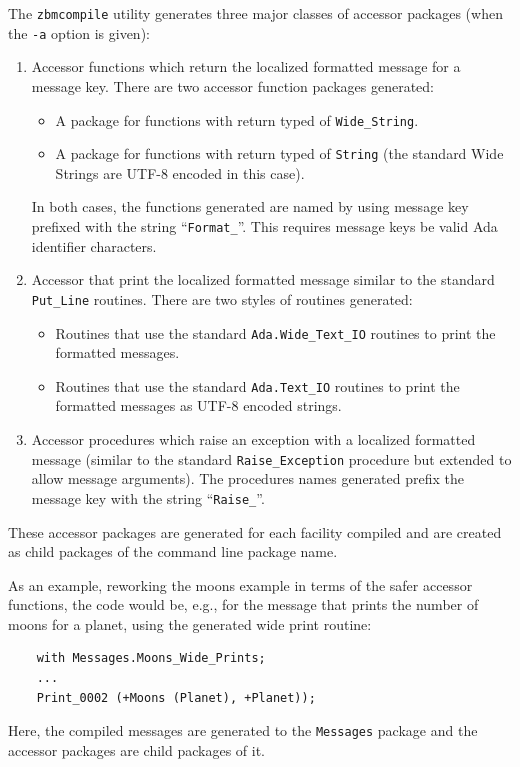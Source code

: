 The \texttt{zbmcompile} utility generates three major classes of accessor
packages (when the \texttt{-a} option is given):
\begin{enumerate}
\item	Accessor functions which return the localized formatted message for
	a message key.  There are two accessor function packages generated:
	\begin{itemize}
	\item	A package for functions with return typed of
	 	\texttt{Wide\_String}.
	\item	A package for functions with return typed of \texttt{String}
		(the standard Wide Strings are UTF-8 encoded in this case).
	\end{itemize}
	In both cases, the functions generated are named by using message key
	prefixed with the string ``\texttt{Format\_}''.  This requires message
	keys be valid Ada identifier characters.
\item   Accessor that print the localized formatted message similar to the
        standard \texttt{Put\_Line} routines.  There are two styles of routines
        generated:
        \begin{itemize}
        \item Routines that use the standard \texttt{Ada.Wide\_Text\_IO}
              routines to print the formatted messages.
        \item Routines that use the standard \texttt{Ada.Text\_IO}
              routines to print the formatted messages as UTF-8 encoded
              strings.
        \end{itemize}
\item	Accessor procedures which raise an exception with a localized formatted
	message (similar to the standard \texttt{Raise\_Exception} procedure
	but extended to allow message arguments).  The procedures names
	generated prefix the message key with the string ``\texttt{Raise\_}''.
\end{enumerate}

These accessor packages are generated for each facility compiled and are
created as child packages of the command line package name.

As an example, reworking the moons example in terms of the safer accessor
functions, the code would be, e.g., for the message that prints the number
of moons for a planet, using the generated wide print routine:
\begin{xmpl}
\begin{verbatim}
    with Messages.Moons_Wide_Prints;
    ...
    Print_0002 (+Moons (Planet), +Planet));
\end{verbatim}
\end{xmpl}
Here, the compiled messages are generated to the \texttt{Messages} package
and the accessor packages are child packages of it.

